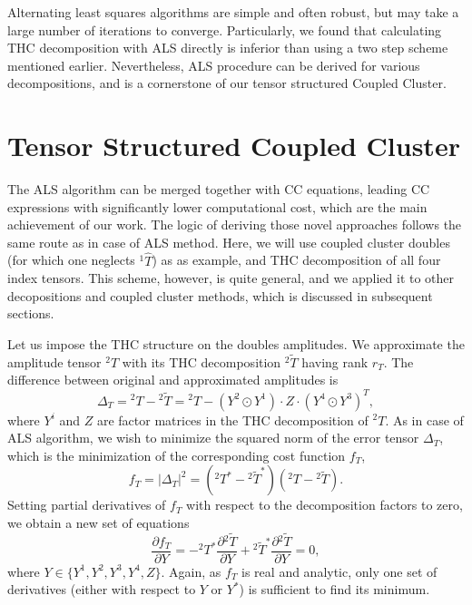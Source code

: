 Alternating least squares algorithms are simple and 
often robust,\cite{uschmajew2012local} but may take a large number of
iterations to converge.\cite{comon2009tensor} Particularly, we found that 
calculating THC decomposition with ALS directly is inferior than using a two 
step scheme mentioned earlier.\cite{schutski2017tensor} Nevertheless, ALS 
procedure can be derived for various decompositions, and is a cornerstone of 
our tensor structured Coupled Cluster.

\section{Tensor Structured Coupled Cluster}
The ALS algorithm can be merged together with CC equations, leading 
CC expressions with significantly lower computational cost, which are the main 
achievement of our work.\cite{schutski2017tensor} The logic of deriving those 
novel approaches follows the same route as in case of ALS method. Here, 
we will use coupled cluster doubles (for which one neglects ${}^1\hat{T}$) as as 
example, and THC decomposition of all four index tensors. This scheme, 
however, is quite general, and we applied it to other decopositions and 
coupled cluster methods, which is discussed in subsequent sections. 

Let us impose the THC structure on the doubles amplitudes. We
approximate the amplitude tensor ${}^{2}T$ with its THC decomposition
${}^{2}\tilde{T}$ having rank $r_{T}$.  The difference between original and 
approximated
amplitudes is
%
\begin{equation} 
\Delta_{T} = {}^{2}T - {}^{2}\tilde{T} = {}^{2}T -
(Y^{2} \odot Y^{1}) \cdot Z \cdot (Y^{4} \odot Y^{3})^{T},
\end{equation}
%
where $Y^{i}$ and $Z$ are factor matrices in the THC
decomposition of ${}^{2}T$. As in case of ALS algorithm, we wish to minimize 
the squared norm of the error tensor $\Delta_{T}$, which is the minimization of 
the corresponding cost function $f_{T}$,
%
\begin{equation}
f_{T} = |\Delta_{T}|^2 = ({}^{2}T^{\ast} -
{}^{2}\tilde{T}^{\ast})({}^{2}T - {}^{2}\tilde{T}).
\end{equation}
%
Setting partial derivatives of $f_{T}$ with respect to
the decomposition factors to zero, we obtain a new set of equations
%
\begin{equation} 
\frac{\partial f_{T}}{\partial Y} = - {}^{2}T^{\ast}
\frac{\partial {}^{2} \tilde{T}}{\partial Y} + {}^{2}\tilde{T}^{\ast}
\frac{\partial {}^{2} \tilde{T}}{\partial Y} = 0,
\label{eq:cc_cost_function}
\end{equation}
%
where $Y \in \{Y^{1}, Y^{2}, Y^{3}, Y^{4}, Z\}$. Again,
as $f_{T}$ is real and analytic, only one set of derivatives (either
with respect to $Y$ or $Y^{\ast}$) is sufficient to find its minimum.

